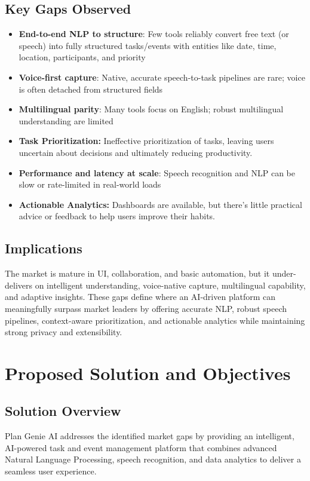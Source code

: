 \documentclass[12pt,a4paper]{article}
\begin{document}
\subsection{Key Gaps Observed}
\begin{itemize}
    \item \textbf{End-to-end NLP to structure}: Few tools reliably convert free text (or speech) into fully structured tasks/events with entities like date, time, location, participants, and priority
    \item \textbf{Voice-first capture}: Native, accurate speech-to-task pipelines are rare; voice is often detached from structured fields
    \item \textbf{Multilingual parity}: Many tools focus on English; robust multilingual understanding are limited
    \item \textbf{Task Prioritization:} Ineffective prioritization of tasks, leaving users uncertain about decisions and ultimately reducing productivity.
    \item \textbf{Performance and latency at scale}: Speech recognition and NLP can be slow or rate-limited in real-world loads
    \item \textbf{Actionable Analytics:} Dashboards are available, but there's little practical advice or feedback to help users improve their habits.
\end{itemize}

\subsection{Implications}
The market is mature in UI, collaboration, and basic automation, but it under-delivers on intelligent understanding, voice-native capture, multilingual capability, and adaptive insights. These gaps define where an AI-driven platform can meaningfully surpass market leaders by offering accurate NLP, robust speech pipelines, context-aware prioritization, and actionable analytics while maintaining strong privacy and extensibility.


\section{Proposed Solution and Objectives}

\subsection{Solution Overview}
Plan Genie AI addresses the identified market gaps by providing an intelligent, AI-powered task and event management platform that combines advanced Natural Language Processing, speech recognition, and data analytics to deliver a seamless user experience.
\end{document}
